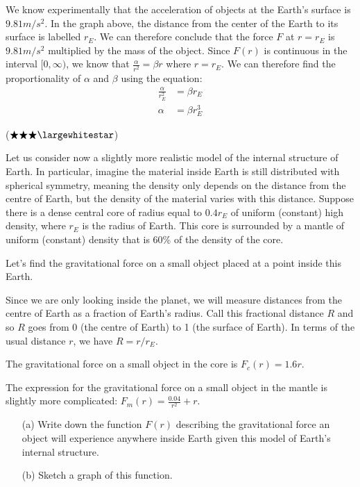 \documentclass{exam}
\begin{document}
\begin{questions}
\begin{parts}
    We know experimentally that the acceleration of objects at the Earth's surface is $9.81 m/s^2$. In the graph above, the distance from the center of the Earth to its surface is labelled $r_E$. We can therefore conclude that the force $F$ at $r = r_E$ is $9.81 m/s^2$ multiplied by the mass of the object. Since $F(r)$ is continuous in the interval $[0, \infty)$, we know that $\frac{\alpha}{r^2} = \beta r$ where $r = r_E$. We can therefore find the proportionality of $\alpha$ and $\beta$ using the equation:
    \begin{align*}
    \frac{\alpha}{r_E^2} &= \beta r_E \\
    \alpha &= \beta r_E^3
    \end{align*}
\end{parts}
\color{black}


\question\label{p} ($\bigstar \bigstar \bigstar \largewhitestar$)

Let us consider now a slightly more realistic model of the internal structure of Earth. In particular, imagine the material inside Earth is still distributed with spherical symmetry, meaning the density only depends on the distance from the centre of Earth, but the density of the material varies with this distance. Suppose there is a dense central core of radius equal to $0.4r_E$ of uniform (constant) high density, where $r_E$ is the radius of Earth. This core is surrounded by a mantle of uniform (constant) density that is 60\% of the density of the core.

Let's find the gravitational force on a small object placed at a point inside this Earth. 

Since we are only looking inside the planet, we will measure distances from the centre of Earth as a fraction of Earth's radius. Call this fractional distance $R$ and so $R$ goes from 0 (the centre of Earth) to 1 (the surface of Earth). In terms of the usual distance $r$, we have $R=r/r_E$.

The gravitational force on a small object in the core is $F_c(r)= 1.6r$. 

The expression for the gravitational force on a small object in the mantle is slightly more complicated: $F_m(r)= \frac{0.04}{r^2}+r$.
\begin{enumerate}
\item[(a)] Write down the function $F(r)$ describing the gravitational force an object will experience anywhere inside Earth given this model of Earth's internal structure.

\item[(b)] Sketch a graph of this function.


\end{enumerate}
\end{questions}
\end{document}
